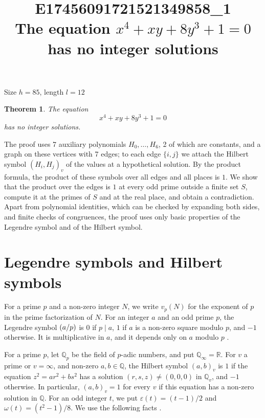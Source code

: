 \documentclass[11pt]{article}
\title{\textbf{E17456091721521349858\_1}\\[4pt] {\Large The equation $x^{4}+xy+8y^{3}+1=0$ has no integer solutions}}
\author{}
\date{}
\newtheorem{theorem}{Theorem}
\newcommand{\Q}{\mathbb{Q}}
\newcommand{\leg}[2]{\mathchoice{\biggl(\dfrac{#1}{#2}\biggr)}{(#1/#2)}{(#1/#2)}{(#1/#2)}}
\begin{document}
\maketitle
\vspace{-8ex}
\begin{center}
Size $h=85$, length $l=12$
\end{center}

\begin{theorem}\label{thm:main}
The equation
\begin{equation}\label{eq:main}
x^{4}+xy+8y^{3}+1=0
\end{equation}
has no integer solutions.
\end{theorem}

The proof uses 7 auxiliary polynomials $H_0,\dots,H_{6}$, 2 of which are constants, and a graph on these vertices with 7 edges; to each edge $\{i,j\}$ we attach the Hilbert symbol $(H_i,H_j)_v$ of the values at a hypothetical solution. By the product formula, the product of these symbols over all edges and all places is $1$. We show that the product over the edges is $1$ at every odd prime outside a finite set $S$, compute it at the primes of $S$ and at the real place, and obtain a contradiction. Apart from polynomial identities, which can be checked by expanding both sides, and finite checks of congruences, the proof uses only basic properties of the Legendre symbol and of the Hilbert symbol.

\section{Legendre symbols and Hilbert symbols}

For a prime $p$ and a non-zero integer $N$, we write $v_p(N)$ for the exponent of $p$ in the prime factorization of $N$. For an integer $a$ and an odd prime $p$, the Legendre symbol $\leg{a}{p}$ is $0$ if $p\mid a$, $1$ if $a$ is a non-zero square modulo $p$, and $-1$ otherwise. It is multiplicative in $a$, and it depends only on $a$ modulo $p$ \cite[Chapter~5]{IR}.

For a prime $p$, let $\Q_p$ be the field of $p$-adic numbers, and put $\Q_\infty=\mathbb R$. For $v$ a prime or $v=\infty$, and non-zero $a,b\in\Q$, the Hilbert symbol $(a,b)_v$ is $1$ if the equation $z^2=ar^2+bs^2$ has a solution $(r,s,z)\neq(0,0,0)$ in $\Q_v$, and $-1$ otherwise. In particular, $(a,b)_v=1$ for every $v$ if this equation has a non-zero solution in $\Q$. For an odd integer $t$, we put $\varepsilon(t)=(t-1)/2$ and $\omega(t)=(t^2-1)/8$. We use the following facts \cite[Chapter~III, Proposition~2 and Theorems~1 and~3]{Se}.
\end{document}
